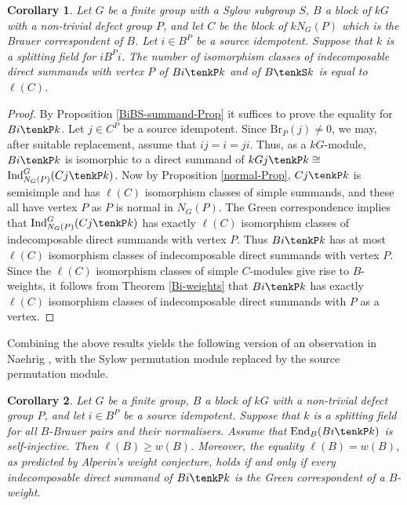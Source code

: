 \documentclass{amsart}
\theoremstyle{plain}\newtheorem{Theorem}{Theorem}[section]
\theoremstyle{plain}\newtheorem{Conjecture}[Theorem]{Conjecture}
\theoremstyle{plain}\newtheorem{Corollary}[Theorem]{Corollary}
\theoremstyle{plain}\newtheorem{Lemma}[Theorem]{Lemma}
\theoremstyle{plain}\newtheorem{Proposition}[Theorem]{Proposition}
\theoremstyle{definition}\newtheorem{Definition}[Theorem]{Definition}
\theoremstyle{definition}\newtheorem{Example}[Theorem]{Example}
\theoremstyle{definition}\newtheorem{Examples}[Theorem]{Examples}
\theoremstyle{definition}\newtheorem{Exercise}[Theorem]{Exercise}
\theoremstyle{definition}\newtheorem{Notation}[Theorem]{Notation}
\theoremstyle{definition}\newtheorem{Remark}[Theorem]{Remark}
\theoremstyle{definition}\newtheorem{Remarks}[Theorem]{Remarks}
\theoremstyle{plain}\newtheorem{Statement}[Theorem]{}
\def\Br{\mathrm{Br}}                 \def\ten{\otimes}
\def\End{\mathrm{End}}
\def\Ind{\mathrm{Ind}}    \def\tenC{\otimes_C}
\begin{document}
\begin{Corollary} \label{ellC-Cor}
Let $G$ be a finite group  with a Sylow subgroup $S$, $B$ a block of $kG$ with 
a non-trivial defect group $P$, and let $C$ be the block of $kN_G(P)$ which is 
the Brauer correspondent of $B$. Let $ i\in B^P$ be a  source idempotent. 
Suppose that $k$ is a splitting field for $iB^Pi$.
The number of isomorphism classes of indecomposable direct summands with
vertex $P$ of $Bi\tenkP k$  and  of  $B\tenkS k$  is equal to $\ell(C)$. 
\end{Corollary}

\begin{proof}
By Proposition \ref{BiBS-summand-Prop}  it suffices to prove the  equality for   
$Bi\tenkP k$.  Let $ j \in C^P$ be a source idempotent.
Since $\Br_P(j)\neq 0$, we may,  after suitable replacement,   assume that  $ij=i=ji$.
Thus, as a $kG$-module, $Bi\tenkP k$ is isomorphic to a direct summand of
$kGj\tenkP k\cong$ $\Ind^G_{N_G(P)}(Cj \tenkP k)$. 
Now  by Proposition \ref{normal-Prop}, $Cj\tenkP k$
is  semisimple  and has $\ell(C)$ isomorphism classes of simple
summands, and these all have vertex $P$ as $P$ is normal in $N_G(P)$.
The Green correspondence implies that $\Ind^G_{N_G(P)}(Cj\tenkP k)$
has exactly $\ell(C)$ isomorphism classes of indecomposable direct summands
with vertex $P$. Thus $Bi\tenkP k$ has at most $\ell(C)$ isomorphism 
classes of indecomposable direct summands with vertex $P$. 
Since the $\ell(C)$ isomorphism classes of simple $C$-modules give rise
to $B$-weights, it follows from Theorem \ref{Bi-weights} that $Bi\tenkP k$ 
has exactly $\ell(C)$ isomorphism classes of indecomposable direct
summands with $P$ as a vertex.
\end{proof}

Combining the above results yields  the following  version of an observation in 
Naehrig \cite[Remark 2(b)]{Nae}, with the Sylow permutation module replaced 
by the source permutation module. 

\begin{Corollary} \label{Bi-selfinjective-Cor}
Let $G$ be a finite group,  $B$ a block of $kG$ 
with a non-trivial defect group $P$, and let $i\in B^P$  be a source idempotent.
Suppose that $k$ is a splitting field for all $B$-Brauer pairs and their normalisers.
Assume that $\End_B(Bi\tenkP k)$ is self-injective.  Then $\ell(B)\geq w(B)$. 
Moreover, the equality  $\ell(B)=w(B)$, as predicted by Alperin's weight conjecture,
holds if and only if every indecomposable  direct summand of $Bi\tenkP k$ is the 
Green correspondent of a $B$-weight.
\end{Corollary}
\end{document}
